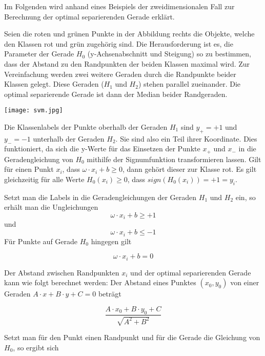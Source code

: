 \documentclass[11pt,ceqn]{book}
\begin{document}
Im Folgenden wird anhand eines Beispiels der zweidimensionalen Fall zur Berechnung der optimal separierenden Gerade erklärt.

\begin{minipage}{0.4\textwidth}\raggedright
Seien die roten und grünen Punkte in der Abbildung rechts die Objekte, welche den Klassen rot und grün zugehörig sind. Die Herausforderung ist es, die Parameter der Gerade $H_0$ (y-Achsenabschnitt und Steigung) so zu bestimmen, dass der Abstand zu den Randpunkten der beiden Klassen maximal wird. Zur Vereinfachung werden zwei weitere Geraden durch die Randpunkte beider Klassen gelegt. Diese Geraden ($H_1$ und $H_2$) stehen parallel zueinander. Die optimal separierende Gerade ist dann der Median beider Randgeraden.
\end{minipage}
\hfill
\begin{minipage}{0.5\textwidth}
\texttt{[image: svm.jpg]}
\end{minipage}

Die Klassenlabels der Punkte oberhalb der Geraden $H_1$ sind $y_+ = +1$ und $y_- = -1$ unterhalb der Geraden $H_2$. Sie sind also ein Teil ihrer Koordinate. Dies funktioniert, da sich die y-Werte für das Einsetzen der Punkte $x_+$ und $x_-$ in die Geradengleichung von $H_0$ mithilfe der Signumfunktion transformieren lassen. Gilt für einen Punkt $x_i$, dass $\omega \cdot x_i + b \geqslant 0$, dann gehört dieser zur Klasse rot. Es gilt gleichzeitig für alle Werte $H_0(x_i) \geqslant 0$, dass $sign(H_0(x_i)) = +1 = y_i$.

Setzt man die Labels in die Geradengleichungen der Geraden $H_1$ und $H_2$ ein, so erhält man die Ungleichungen
\begin{equation} \label{hplus}
\omega \cdot x_i +b \geqslant +1
\end{equation}
und 
\begin{equation} \label{hminus}
\omega \cdot x_i +b \leqslant -1
\end{equation}
Für Punkte auf Gerade $H_0$ hingegen gilt 

$$\omega \cdot x_i +b = 0$$

Der Abstand zwischen Randpunkten $x_i$ und der optimal separierenden Gerade kann wie folgt berechnet werden: Der Abstand eines Punktes $(x_0, y_0)$ von einer Geraden $A \cdot x + B \cdot y + C = 0$ beträgt
  
$$\frac{A \cdot x_0 + B \cdot y_0 +C}{\sqrt{A^2 + B^2}}$$

Setzt man für den Punkt einen Randpunkt und für die Gerade die Gleichung von $H_0$, so ergibt sich 
\end{document}
